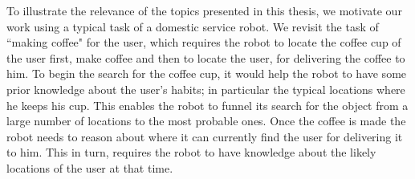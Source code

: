To illustrate the relevance of the topics presented in this thesis, we motivate our work using a typical task of a domestic service robot.   We revisit the task of ``making coffee" for the user, which requires the robot to locate the coffee cup of the user first, make coffee and then to locate the user, for delivering the coffee to him. To begin the search for the coffee cup, it would help the robot to have some prior knowledge about the user's habits; in particular the typical locations where he keeps his cup. This enables the robot to funnel its search for the object from a large number of locations to the most probable ones. Once the coffee is made the robot needs to reason about where it can currently find the user for delivering it to him. This in turn, requires the robot to have knowledge about the likely locations of the user at that time.

